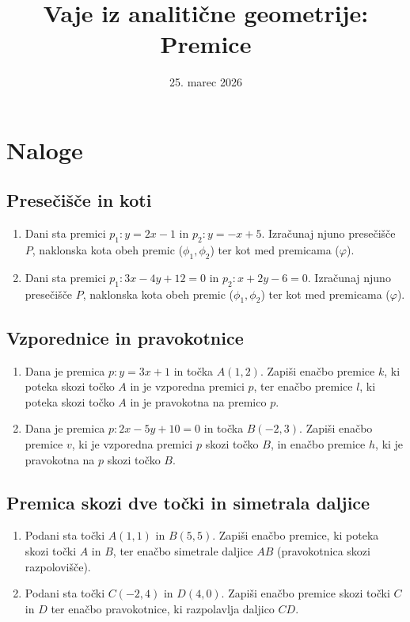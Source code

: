 \documentclass[12pt, a4paper]{article}
\title{Vaje iz analitične geometrije: Premice}
\author{}
\date{25. marec 2026}
\begin{document}
\maketitle

\section{Naloge}

\subsection*{Presečišče in koti}
\begin{enumerate}
    \item Dani sta premici $p_1: y = 2x - 1$ in $p_2: y = -x + 5$. Izračunaj njuno presečišče $P$, naklonska kota obeh premic ($\phi_1, \phi_2$) ter kot med premicama ($\varphi$).
    \item Dani sta premici $p_1: 3x - 4y + 12 = 0$ in $p_2: x + 2y - 6 = 0$. Izračunaj njuno presečišče $P$, naklonska kota obeh premic ($\phi_1, \phi_2$) ter kot med premicama ($\varphi$).
\end{enumerate}

\subsection*{Vzporednice in pravokotnice}
\begin{enumerate}
    \setcounter{enumerate}{2}
    \item Dana je premica $p: y = 3x + 1$ in točka $A(1, 2)$. Zapiši enačbo premice $k$, ki poteka skozi točko $A$ in je vzporedna premici $p$, ter enačbo premice $l$, ki poteka skozi točko $A$ in je pravokotna na premico $p$.
    \item Dana je premica $p: 2x - 5y + 10 = 0$ in točka $B(-2, 3)$. Zapiši enačbo premice $v$, ki je vzporedna premici $p$ skozi točko $B$, in enačbo premice $h$, ki je pravokotna na $p$ skozi točko $B$.
\end{enumerate}

\subsection*{Premica skozi dve točki in simetrala daljice}
\begin{enumerate}
    \setcounter{enumerate}{4}
    \item Podani sta točki $A(1, 1)$ in $B(5, 5)$. Zapiši enačbo premice, ki poteka skozi točki $A$ in $B$, ter enačbo simetrale daljice $AB$ (pravokotnica skozi razpolovišče).
    \item Podani sta točki $C(-2, 4)$ in $D(4, 0)$. Zapiši enačbo premice skozi točki $C$ in $D$ ter enačbo pravokotnice, ki razpolavlja daljico $CD$.
\end{enumerate}
\end{document}
